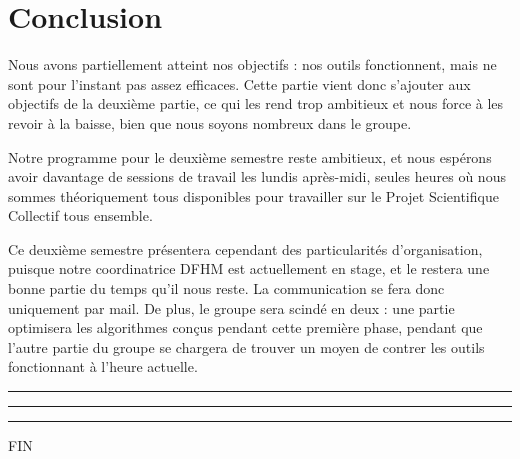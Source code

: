 \documentclass[a4paper, 12pt,twoside]{article}
\begin{document}
\newpage
{}
\section*{Conclusion}
	Nous avons partiellement atteint nos objectifs : nos outils fonctionnent, mais ne sont pour l'instant pas assez efficaces. Cette partie vient donc s'ajouter aux objectifs de la deuxième partie, ce qui les rend trop ambitieux et nous force à les revoir à la baisse, bien que nous soyons nombreux dans le groupe.
	
	Notre programme pour le deuxième semestre reste ambitieux, et nous espérons avoir davantage de sessions de travail les lundis après-midi, seules heures où nous sommes théoriquement tous disponibles pour travailler sur le Projet Scientifique Collectif tous ensemble.
	
	Ce deuxième semestre présentera cependant des particularités d'organisation, puisque notre coordinatrice DFHM est actuellement en stage, et le restera une bonne partie du temps qu'il nous reste. La communication se fera donc uniquement par mail. De plus, le groupe sera scindé en deux : une partie optimisera les algorithmes conçus pendant cette première phase, pendant que l'autre partie du groupe se chargera de trouver un moyen de contrer les outils fonctionnant à l'heure actuelle.
	
\begin{center}
\color{bleu303}

\rule{0.3\textwidth}{0.2mm}\vspace*{-3.5mm}

\rule{0.5\textwidth}{0.6mm}\vspace*{-3.8mm}

\rule{0.3\textwidth}{0.2mm}\vspace*{-1mm}

\sffamily FIN
\end{center}
\end{document}
